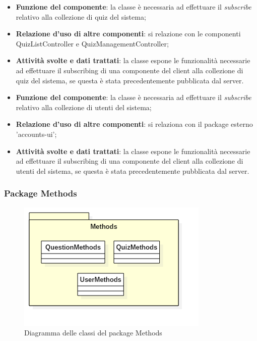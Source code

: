 
\begin{itemize}
	\item\textbf{Funzione del componente}: la classe è necessaria ad effettuare il \emph{subscribe} relativo alla collezione di quiz del sistema;
	\item\textbf{Relazione d'uso di altre componenti}: si relazione con le componenti QuizListController e QuizManagementController;
	\item\textbf{Attività svolte e dati trattati}: la classe espone le funzionalità necessarie ad effettuare il subscribing di una componente del client alla collezione di quiz del sistema, se questa è stata precedentemente pubblicata dal server.
\end{itemize}


\begin{itemize}
	\item\textbf{Funzione del componente}: la classe è necessaria ad effettuare il \emph{subscribe} relativo alla collezione di utenti del sistema;
	\item\textbf{Relazione d'uso di altre componenti}: si relaziona con il package esterno 'accounts-ui';
	\item\textbf{Attività svolte e dati trattati}: la classe espone le funzionalità necessarie ad effettuare il subscribing di una componente del client alla collezione di utenti del sistema, se questa è stata precedentemente pubblicata dal server.
\end{itemize}

\subsubsection{Package Methods}
\begin{figure}[h!]
\begin{center}
	\includegraphics[scale=0.65]{../images/MethodsClass.png}
	\caption{Diagramma delle classi del package Methods}
\end{center}
\end{figure}

